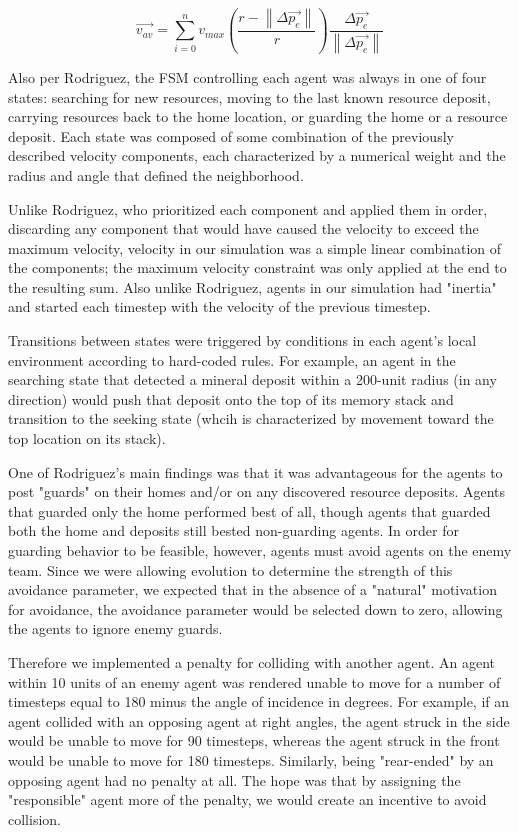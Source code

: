 \documentclass[12pt,journal,compsoc]{IEEEtran}
\begin{document}
\[ \vec { v_{ av } } =\sum _{i=0}^{n} {v_{ max } \left( \frac{r - \left\| \Delta \vec{p_e} \right\|} {r} \right) \frac { \Delta \vec { p_e }  }{ \left\| \Delta \vec { p_e }  \right\|  }}  \]

Also per Rodriguez, the FSM controlling each agent was always in one of four states: searching for new resources, moving to the last known resource deposit, carrying resources back to the home location, or guarding the home or a resource deposit. Each state was composed of some combination of the previously described velocity components, each characterized by a numerical weight and the radius and angle that defined the neighborhood.

Unlike Rodriguez, who prioritized each component and applied them in order, discarding any component that would have caused the velocity to exceed the maximum velocity, velocity in our simulation was a simple linear combination of the components; the maximum velocity constraint was only applied at the end to the resulting sum. Also unlike Rodriguez, agents in our simulation had "inertia" and started each timestep with the velocity of the previous timestep.

Transitions between states were triggered by conditions in each agent's local environment according to hard-coded rules. For example, an agent in the searching state that detected a mineral deposit within a 200-unit radius (in any direction) would push that deposit onto the top of its memory stack and transition to the seeking state (whcih is characterized by movement toward the top location on its stack).

One of Rodriguez's main findings was that it was advantageous for the agents to post "guards" on their homes and/or on any discovered resource deposits. Agents that guarded only the home performed best of all, though agents that guarded both the home and deposits still bested non-guarding agents. In order for guarding behavior to be feasible, however, agents must avoid agents on the enemy team. Since we were allowing evolution to determine the strength of this avoidance parameter, we expected that in the absence of a "natural" motivation for avoidance, the avoidance parameter would be selected down to zero, allowing the agents to ignore enemy guards.

Therefore we implemented a penalty for colliding with another agent. An agent within 10 units of an enemy agent was rendered unable to move for a number of timesteps equal to 180 minus the angle of incidence in degrees. For example, if an agent collided with an opposing agent at right angles, the agent struck in the side would be unable to move for 90 timesteps, whereas the agent struck in the front would be unable to move for 180 timesteps. Similarly, being "rear-ended" by an opposing agent had no penalty at all. The hope was that by assigning the "responsible" agent more of the penalty, we would create an incentive to avoid collision.
\end{document}
